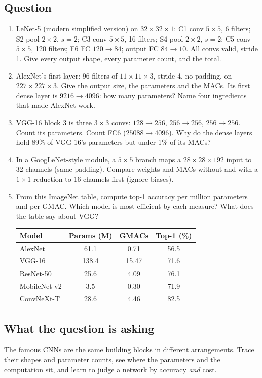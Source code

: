 \documentclass[12pt,a4paper]{article}
\begin{document}
\subsection*{Question}
\begin{enumerate}[label=(\alph*)]
\item LeNet-5 (modern simplified version) on $32\times32\times1$: C1 conv $5\times5$, 6 filters; S2 pool $2\times2$, $s=2$; C3 conv $5\times5$, 16 filters; S4 pool $2\times2$, $s=2$; C5 conv $5\times5$, 120 filters; F6 FC $120\to84$; output FC $84\to10$. All convs valid, stride 1. Give every output shape, every parameter count, and the total.
\item AlexNet's first layer: 96 filters of $11\times11\times3$, stride 4, no padding, on $227\times227\times3$. Give the output size, the parameters and the MACs. Its first dense layer is $9216\to4096$: how many parameters? Name four ingredients that made AlexNet work.
\item VGG-16 block 3 is three $3\times3$ convs: $128\to256$, $256\to256$, $256\to256$. Count its parameters. Count FC6 ($25088\to4096$). Why do the dense layers hold 89\% of VGG-16's parameters but under 1\% of its MACs?
\item In a GoogLeNet-style module, a $5\times5$ branch maps a $28\times28\times192$ input to 32 channels (same padding). Compare weights and MACs without and with a $1\times1$ reduction to 16 channels first (ignore biases).
\item From this ImageNet table, compute top-1 accuracy per million parameters and per GMAC. Which model is most efficient by each measure? What does the table say about VGG?
\begin{center}
\begin{tabular}{@{}lccc@{}}
\toprule
Model & Params (M) & GMACs & Top-1 (\%)\\
\midrule
AlexNet & 61.1 & 0.71 & 56.5\\
VGG-16 & 138.4 & 15.47 & 71.6\\
ResNet-50 & 25.6 & 4.09 & 76.1\\
MobileNet v2 & 3.5 & 0.30 & 71.9\\
ConvNeXt-T & 28.6 & 4.46 & 82.5\\
\bottomrule
\end{tabular}
\end{center}
\end{enumerate}

\subsection*{What the question is asking}
The famous CNNs are the same building blocks in different arrangements. Trace their shapes and parameter counts, see where the parameters and the computation sit, and learn to judge a network by accuracy \emph{and} cost.
\end{document}
